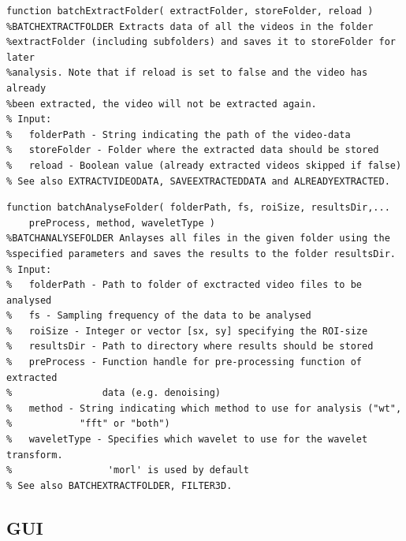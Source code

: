 \documentclass[11pt]{scrartcl}
\begin{document}
\begin{minipage}{\linewidth}
  \begin{lstlisting}[caption={Function for extracting data from videos.}, label=extract]
function batchExtractFolder( extractFolder, storeFolder, reload )
%BATCHEXTRACTFOLDER Extracts data of all the videos in the folder 
%extractFolder (including subfolders) and saves it to storeFolder for later 
%analysis. Note that if reload is set to false and the video has already 
%been extracted, the video will not be extracted again.
% Input:
%   folderPath - String indicating the path of the video-data
%   storeFolder - Folder where the extracted data should be stored
%   reload - Boolean value (already extracted videos skipped if false)
% See also EXTRACTVIDEODATA, SAVEEXTRACTEDDATA and ALREADYEXTRACTED.
\end{lstlisting}
\end{minipage}

\begin{minipage}{\linewidth}
  \begin{lstlisting}[caption={Function for analysing extracted data.}, label=process]
function batchAnalyseFolder( folderPath, fs, roiSize, resultsDir,...
    preProcess, method, waveletType )
%BATCHANALYSEFOLDER Anlayses all files in the given folder using the
%specified parameters and saves the results to the folder resultsDir.
% Input:
%   folderPath - Path to folder of exctracted video files to be analysed
%   fs - Sampling frequency of the data to be analysed
%   roiSize - Integer or vector [sx, sy] specifying the ROI-size
%   resultsDir - Path to directory where results should be stored
%   preProcess - Function handle for pre-processing function of extracted
%                data (e.g. denoising)
%   method - String indicating which method to use for analysis ("wt",
%            "fft" or "both")
%   waveletType - Specifies which wavelet to use for the wavelet transform.
%                 'morl' is used by default
% See also BATCHEXTRACTFOLDER, FILTER3D.
\end{lstlisting}
\end{minipage}


\subsection{GUI}
\end{document}
